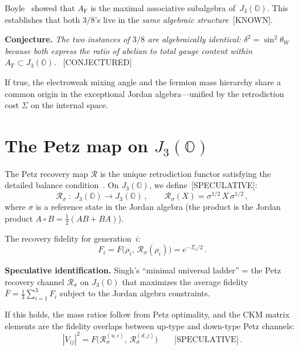 \documentclass[prl,twocolumn,superscriptaddress,longbibliography]{revtex4-2}
\newcommand{\AF}{A_{\mathrm{F}}}
\newcommand{\JO}{J_3(\mathbb{O})}
\newcommand{\Petz}{\mathcal{R}}
\begin{document}
Boyle~\cite{Boyle2020} showed that
$\AF$ is the maximal associative subalgebra of~$\JO$.
This establishes that both $3/8$'s live in the
\emph{same algebraic structure}~[KNOWN].

\medskip
\noindent\textbf{Conjecture.}\;
\emph{The two instances of $3/8$ are algebraically
identical: $\delta^2 = \sin^2\theta_W$ because both
express the ratio of abelian to total gauge content
within $\AF \subset \JO$.}
~[CONJECTURED]

If true, the electroweak mixing angle and the
fermion mass hierarchy share a common origin in
the exceptional Jordan algebra---unified by the
retrodiction cost $\Sigma$ on the internal space.


\section{The Petz map on $J_3(\mathbb{O})$}
\label{sec:petz_J3O}

The Petz recovery map $\Petz$ is the unique
retrodiction functor satisfying the detailed balance
condition~\cite{PaperI,Petz1986}.
On $\JO$, we define~[SPECULATIVE]:
\begin{equation}
  \Petz_\sigma \;\colon\;
  J_3(\mathbb{O}) \to J_3(\mathbb{O})\,,
  \qquad
  \Petz_\sigma(X) = \sigma^{1/2}\,X\,\sigma^{1/2}\,,
\end{equation}
where $\sigma$ is a reference state in the Jordan
algebra (the product is the Jordan product
$A \circ B = \tfrac{1}{2}(AB + BA)$).

The recovery fidelity for generation~$i$:
\begin{equation}
  F_i = F\bigl(\rho_i,\, \Petz_\sigma(\rho_i)\bigr)
  = e^{-\Sigma_i/2}\,.
\end{equation}

\noindent\textbf{Speculative identification.}\;
Singh's ``minimal universal ladder'' = the Petz
recovery channel $\Petz_\sigma$ on $\JO$ that
maximizes the average fidelity
$\bar{F} = \frac{1}{3}\sum_{i=1}^{3} F_i$
subject to the Jordan algebra constraints.

If this holds, the mass ratios follow from Petz
optimality, and the CKM matrix elements are
the fidelity overlaps between up-type and
down-type Petz channels:
\begin{equation}
  |V_{ij}|^2 = F\bigl(\Petz_\sigma^{(u,i)},\,
  \Petz_\sigma^{(d,j)}\bigr)
  \qquad\text{[SPECULATIVE]}\,.
\end{equation}
\end{document}

